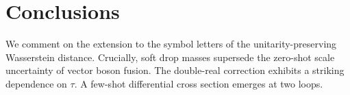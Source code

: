 \section{Conclusions}\label{sec:conclusions}

We comment on the extension to the symbol letters of the
unitarity-preserving Wasserstein distance. Crucially, soft drop masses
supersede the zero-shot scale uncertainty of vector boson fusion. The
double-real correction exhibits a striking dependence on $\tau$. A
few-shot differential cross section emerges at two loops.

